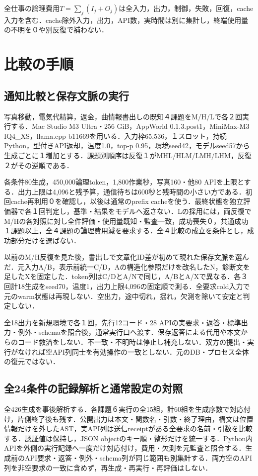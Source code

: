 \documentclass[uplatex,a4paper,twocolumn,10pt]{jsarticle}
\begin{document}
全仕事の論理費用$T=\sum_j(I_j+O_j)$は全入力，出力，制御，失敗，回復，cache入力を含む．cache除外入力，出力，API数，実時間は別に集計し，終端使用量の不明を０や別反復で補わない．

\section{比較の手順}
\subsection{通知比較と保存文脈の実行}
写真移動，電気代精算，返金，曲情報書出しの既知４課題をM/H/Lで各２回実行する．Mac Studio M3 Ultra・256 GiB，AppWorld 0.1.3.post1，MiniMax-M3 IQ4\_XS，llama.cpp b11669を用いる．入力枠65,536，１スロット，持続Python，型付きAPI返却，温度1.0，top-p 0.95，環境seed42，モデルseed57から生成ごとに１増加とする．課題別順序は反復１がMHL/HLM/LMH/LHM，反復２がその逆順である．

各条件80生成，450,000論理token，1,800作業秒，写真160・他80 APIを上限とする．出力上限は4,096と残予算，通信待ちは600秒と残時間の小さい方である．初回cache再利用０を確認し，以後は通常のprefix cacheを使う．最終状態を独立評価器で各１回判定し，基準・結果をモデルへ返さない．Lの採用には，両反復でM/Hの各対照に対し全件評価・使用量既知・監査一致，成功喪失０，共通成功１課題以上，全４課題の論理費用減を要求する．全４比較の成立を条件とし，成功部分だけを選ばない．

以前のM/H反復を見た後，書出しで文章化ID差が初めて現れた保存文脈を選んだ．元入力A/B，表示前統一C/D，Aの構造化参照だけを改名したN，診断文を足したXを固定した．token列はC/DとA/Nで同じ，A/BとA/Xで異なる．各３回計18生成をseed70，温度1，出力上限4,096の固定順で測る．全要求cold入力で元のwarm状態は再現しない．空出力，途中切れ，揺れ，欠測を除いて安定と判定しない．

全18出力を新規環境で各１回，先行12コード・28 APIの実要求・返答・標準出力・例外・schemaを照合後，通常実行口へ渡す．保存返答による代用や本文からのコード救済をしない．不一致・不明時は停止し補充しない．双方の提出・実行がなければ空API列同士を有効操作の一致としない．元のDB・プロセス全体の復元ではない．

\subsection{全24条件の記録解析と通常設定の対照}
全426生成を事後解析する．各課題６実行の全15組，計60組を生成序数で対応付け，片側終了後も残す．公開出力は本文・関数名・引数・終了理由，構文は位置情報だけを外したAST，実API列は送信receiptがある全要求の名前・引数を比較する．認証値は保持し，JSON objectのキー順・整形だけを統一する．Python内APIを外側の実行記録へ一度だけ対応付け，費用・欠測を元監査と照合する．生成前のAPI要求・返答・例外・schema列が同じ範囲も別集計する．両方空のAPI列を非空要求の一致に含めず，再生成・再実行・再評価はしない．
\end{document}
